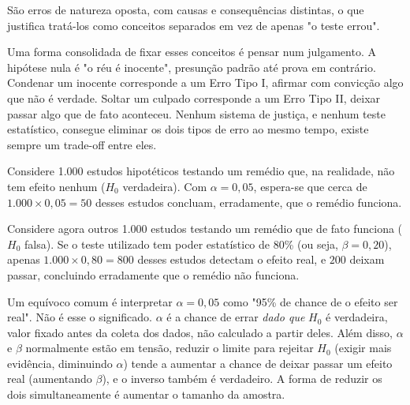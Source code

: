 {\hspace*{1.5em} São erros de natureza oposta,
com causas e consequências distintas,
o que justifica tratá-los como conceitos separados em vez de apenas "o teste errou".


\hspace*{1.5em} Uma forma consolidada de fixar esses conceitos é pensar num julgamento.
A hipótese nula é "o réu é inocente",
presunção padrão até prova em contrário.
Condenar um inocente corresponde a um Erro Tipo I,
afirmar com convicção algo que não é verdade.
Soltar um culpado corresponde a um Erro Tipo II,
deixar passar algo que de fato aconteceu.
Nenhum sistema de justiça, e nenhum teste estatístico,
consegue eliminar os dois tipos de erro ao mesmo tempo,
existe sempre um trade-off entre eles.

\subtitle{Um exemplo numérico}

\hspace*{1.5em} Considere 1.000 estudos hipotéticos testando um remédio que,
na realidade, não tem efeito nenhum ($H_0$ verdadeira).
Com $\alpha = 0{,}05$,
espera-se que cerca de $1.000 \times 0{,}05 = 50$ desses estudos concluam,
erradamente, que o remédio funciona.

\hspace*{1.5em} Considere agora outros 1.000 estudos testando um remédio que de fato funciona
($H_0$ falsa).
Se o teste utilizado tem poder estatístico de 80\% (ou seja, $\beta = 0{,}20$),
apenas $1.000 \times 0{,}80 = 800$ desses estudos detectam o efeito real,
e $200$ deixam passar,
concluindo erradamente que o remédio não funciona.

\subtitle{Uma ressalva importante}

\hspace*{1.5em} Um equívoco comum é interpretar $\alpha = 0{,}05$ como
"95\% de chance de o efeito ser real".
Não é esse o significado.
$\alpha$ é a chance de errar \textit{dado que} $H_0$ é verdadeira,
valor fixado antes da coleta dos dados,
não calculado a partir deles.
Além disso, $\alpha$ e $\beta$ normalmente estão em tensão,
reduzir o limite para rejeitar $H_0$ (exigir mais evidência, diminuindo $\alpha$)
tende a aumentar a chance de deixar passar um efeito real (aumentando $\beta$),
e o inverso também é verdadeiro.
A forma de reduzir os dois simultaneamente é aumentar o tamanho da amostra.

}
